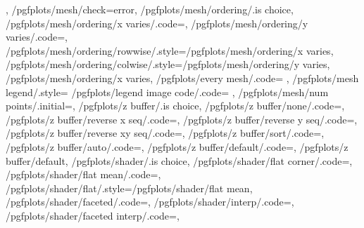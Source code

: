 {{{		}{%
		}%
	},%
	/pgfplots/mesh/check=error,
	/pgfplots/mesh/ordering/.is choice,
	/pgfplots/mesh/ordering/x varies/.code={\def\pgfplots@plot@mesh@ordering{0}},
	/pgfplots/mesh/ordering/y varies/.code={\def\pgfplots@plot@mesh@ordering{1}},
	/pgfplots/mesh/ordering/rowwise/.style={/pgfplots/mesh/ordering/x varies},
	/pgfplots/mesh/ordering/colwise/.style={/pgfplots/mesh/ordering/y varies},
	/pgfplots/mesh/ordering/x varies,
	/pgfplots/every mesh/.code={%
	},%
	/pgfplots/mesh legend/.style={%
		/pgfplots/legend image code/.code={%
		}%
	},
	/pgfplots/mesh/num points/.initial=,%
	/pgfplots/z buffer/.is choice,%
	/pgfplots/z buffer/none/.code={\def\pgfplotsplothandlermesh@zbuffer@choice{0}},%
	/pgfplots/z buffer/reverse x seq/.code={\def\pgfplotsplothandlermesh@zbuffer@choice{1}},%
	/pgfplots/z buffer/reverse y seq/.code={\def\pgfplotsplothandlermesh@zbuffer@choice{2}},%
	/pgfplots/z buffer/reverse xy seq/.code={\def\pgfplotsplothandlermesh@zbuffer@choice{3}},%
	/pgfplots/z buffer/sort/.code={\def\pgfplotsplothandlermesh@zbuffer@choice{4}},%
	/pgfplots/z buffer/auto/.code={\def\pgfplotsplothandlermesh@zbuffer@choice{5}},%
	/pgfplots/z buffer/default/.code={\def\pgfplotsplothandlermesh@zbuffer@choice{6}},%
	/pgfplots/z buffer/default,%
	/pgfplots/shader/.is choice,
	/pgfplots/shader/flat corner/.code={\def\pgfplotsplothandlermesh@shader{0}\def\pgfplotsplothandlermesh@flatmode{c}},
	/pgfplots/shader/flat mean/.code={\def\pgfplotsplothandlermesh@shader{0}\def\pgfplotsplothandlermesh@flatmode{m}},
	/pgfplots/shader/flat/.style={/pgfplots/shader/flat mean},%
	/pgfplots/shader/faceted/.code={\def\pgfplotsplothandlermesh@shader{1}},
	/pgfplots/shader/interp/.code={\def\pgfplotsplothandlermesh@shader{2}},
	/pgfplots/shader/faceted interp/.code={\def\pgfplotsplothandlermesh@shader{3}},
}
